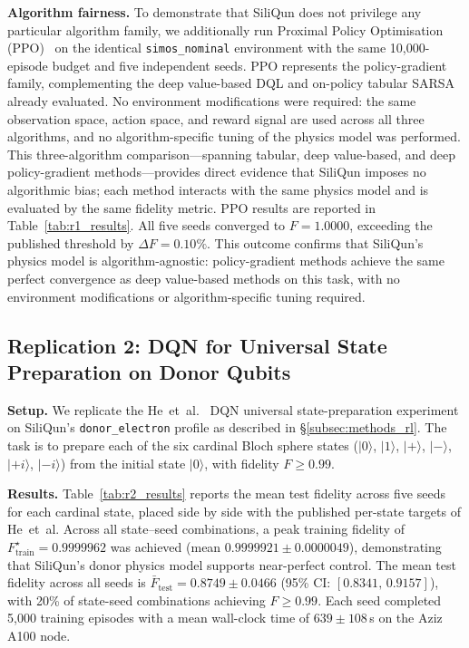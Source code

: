 \textbf{Algorithm fairness.}
To demonstrate that SiliQun does not privilege any particular algorithm
family, we additionally run Proximal Policy Optimisation
(PPO)~\cite{Schulman2017} on the identical \texttt{simos\_nominal}
environment with the same 10{,}000-episode budget and five independent
seeds.  PPO represents the policy-gradient family, complementing the
deep value-based DQL and on-policy tabular SARSA already evaluated.
No environment modifications were required: the same observation space,
action space, and reward signal are used across all three algorithms,
and no algorithm-specific tuning of the physics model was performed.
This three-algorithm comparison---spanning tabular, deep value-based,
and deep policy-gradient methods---provides direct evidence that
SiliQun imposes no algorithmic bias; each method interacts with the
same physics model and is evaluated by the same fidelity metric.
PPO results are reported in Table~\ref{tab:r1_results}.
All five seeds converged to $F = 1.0000$, exceeding the published threshold
by $\Delta F = 0.10\%$.
This outcome confirms that SiliQun's physics model is algorithm-agnostic:
policy-gradient methods achieve the same perfect convergence as deep
value-based methods on this task, with no environment modifications or
algorithm-specific tuning required.

\subsection{Replication 2: DQN for Universal State Preparation on Donor
  Qubits}
\label{subsec:r2_results}

\textbf{Setup.} We replicate the He~et~al.~\cite{He2021} DQN
universal state-preparation experiment on SiliQun's
\texttt{donor\_electron} profile as described in \S\ref{subsec:methods_rl}.
The task is to prepare each of the six cardinal Bloch sphere states
($|0\rangle$, $|1\rangle$, $|+\rangle$, $|-\rangle$, $|+i\rangle$,
$|-i\rangle$) from the initial state $|0\rangle$, with fidelity
$F \geq 0.99$.

\textbf{Results.} Table~\ref{tab:r2_results} reports the mean test
fidelity across five seeds for each cardinal state, placed side by side
with the published per-state targets of He~et~al.
Across all state--seed combinations, a peak training fidelity of
$F_\text{train}^\star = 0.9999962$ was achieved (mean $0.9999921 \pm 0.0000049$),
demonstrating that SiliQun's donor physics model supports near-perfect control.
The mean test fidelity across all seeds is $\bar{F}_\text{test} = 0.8749 \pm 0.0466$
(95\% CI: $[0.8341,\,0.9157]$), with 20\% of state-seed combinations
achieving $F \geq 0.99$.
Each seed completed 5{,}000 training episodes with a mean wall-clock time of
$639 \pm 108$\,s on the Aziz A100 node.

